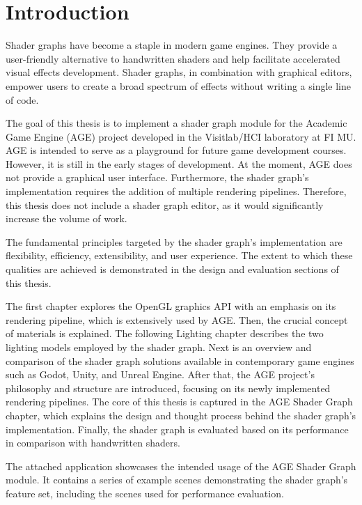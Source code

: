 \documentclass[
  digital,     %
  oneside,     %
  nosansbold,  %
  nocolorbold, %
  lof,         %
  lot,         %
]{fithesis4}
\begin{document}
\setlength{\parskip}{8pt}
\setlength{\parindent}{0pt}

\chapter*{Introduction}

Shader graphs have become a staple in modern game engines.
They provide a user-friendly alternative to handwritten shaders and help facilitate accelerated visual effects development.
Shader graphs, in combination with graphical editors,
empower users to create a broad spectrum of effects without writing a single line of code.

The goal of this thesis is to implement a shader graph module for the Academic Game Engine (AGE) project
developed in the Visitlab/HCI laboratory at FI MU. AGE is intended to serve as a playground
for future game development courses.
However, it is still in the early stages of development.
At the moment, AGE does not provide a graphical user interface. Furthermore, the shader graph's implementation
requires the addition of multiple rendering pipelines. Therefore, this thesis does not include a shader graph editor,
as it would significantly increase the volume of work.

The fundamental principles targeted by the shader graph's implementation are flexibility, efficiency,
extensibility, and user experience. The extent to which these qualities are achieved
is demonstrated in the design and evaluation sections of this thesis.

The first chapter explores the OpenGL graphics API with an emphasis on its rendering pipeline,
which is extensively used by AGE. Then, the crucial concept of materials is explained.
The following Lighting chapter describes the two lighting models employed by the shader graph.
Next is an overview and comparison of the shader graph solutions available in contemporary game engines
such as Godot, Unity, and Unreal Engine. After that, the AGE project's philosophy and structure are introduced,
focusing on its newly implemented rendering pipelines. The core of this thesis
is captured in the AGE Shader Graph chapter, which explains the design and thought process
behind the shader graph's implementation. Finally, the shader graph is evaluated based on
its performance in comparison with handwritten shaders.

The attached application showcases the intended usage of the AGE Shader Graph module.
It contains a series of example scenes demonstrating the shader graph's feature set,
including the scenes used for performance evaluation.
\end{document}
